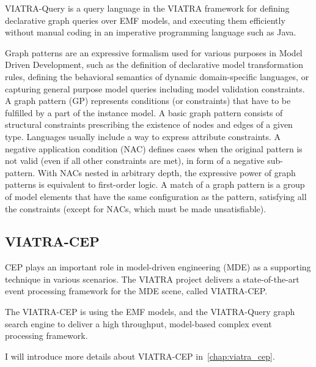 VIATRA-Query is a query language in the VIATRA framework for defining declarative graph queries over EMF models, and executing them efficiently without manual coding in an imperative programming language such as Java\citep{IncQuery}.

Graph  patterns are  an  expressive  formalism used for various purposes in Model Driven Development,  such  as  the definition of  declarative  model transformation  rules,  defining  the  behavioral  semantics of dynamic domain-specific languages, or capturing general purpose model queries including model validation constraints. A graph pattern (GP) represents  conditions  (or  constraints)  that  have  to be fulfilled by a part of the instance model. A basic graph pattern consists of structural constraints prescribing the existence of nodes and edges of a given type. Languages usually include a way to express attribute constraints. A negative application condition (NAC) defines cases when the original pattern is not valid (even if all other constraints are met), in form of a negative sub-pattern. With NACs nested in arbitrary depth, the expressive power of graph patterns is equivalent to first-order logic. A match of a graph pattern is a group of model elements that have the same configuration as the pattern, satisfying all the constraints (except for NACs, which must be made unsatisfiable)\citep{bergmann2010incremental}.


\subsection{VIATRA-CEP}
CEP plays an important role in model-driven engineering (MDE) as a supporting technique in various scenarios. The VIATRA project delivers a state-of-the-art event processing framework for the MDE scene, called VIATRA-CEP\citep{CEP}. 

The VIATRA-CEP is using the EMF models, and the VIATRA-Query graph search engine to deliver a high throughput, model-based complex event processing framework.

I will introduce more details about VIATRA-CEP in~\cref{chap:viatra_cep}.



